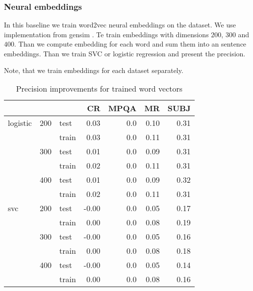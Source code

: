     \* %

    \subsubsection{Neural embeddings}
    In this baseline we train word2vec neural embeddings on the dataset. 
    We use implementation from gensim .
    Te train embeddings with dimensions $200$, $300$ and $400$. 
    Than we compute embedding for each word and sum them into an sentence embeddings.
    Than we train SVC or logistic regression and present the precision.
    
    Note, that we train embeddings for each dataset separately.

\begin{table}[H]
\begin{center}

\begin{tabular}{lllrrrr}
\toprule
 & &&CR &MPQA &MR &SUBJ \\
\midrule
logistic & 200 & test & 0.03 &0.0 & 0.10 & 0.31 \\
 & & train & 0.03 &0.0 & 0.11 & 0.31 \\
 & 300 & test & 0.01 &0.0 & 0.09 & 0.31 \\
 & & train & 0.02 &0.0 & 0.11 & 0.31 \\
 & 400 & test & 0.01 &0.0 & 0.09 & 0.32 \\
 & & train & 0.02 &0.0 & 0.11 & 0.31 \\
svc & 200 & test &-0.00 &0.0 & 0.05 & 0.17 \\
 & & train & 0.00 &0.0 & 0.08 & 0.19 \\
 & 300 & test &-0.00 &0.0 & 0.05 & 0.16 \\
 & & train & 0.00 &0.0 & 0.08 & 0.18 \\
 & 400 & test &-0.00 &0.0 & 0.05 & 0.14 \\
 & & train & 0.00 &0.0 & 0.08 & 0.16 \\
\bottomrule
\end{tabular}


\caption[Precision improvements for trained word vectors]{Precision improvements for trained word vectors}
\label{tab:res:trainedwordvec}
\end{center}
\end{table}

